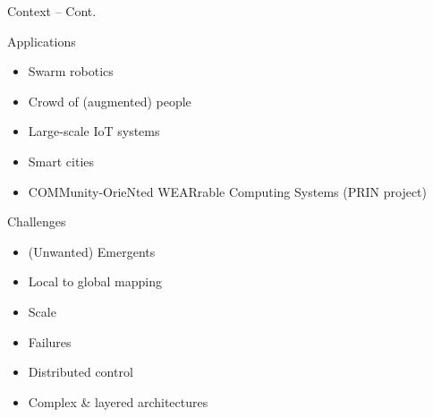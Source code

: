 \documentclass[presentation, 9pt, aspectratio=169]{beamer}\mode<presentation>{\usetheme{AMSBolognaFC}}
\begin{document}
\begin{frame}{Context -- Cont.}
\begin{alertblock}{Applications}
  \begin{multicols}{3}
    \begin{itemize}
      \item Swarm robotics
      \item Crowd of (augmented) people
      \item Large-scale IoT systems
      \item Smart cities
      \item COMMunity-OrieNted WEARrable Computing Systems (PRIN project)
    \end{itemize}
  \end{multicols}
\end{alertblock}

\begin{exampleblock}{Challenges}
  \begin{multicols}{3}
    \begin{itemize}
      \item (Unwanted) Emergents
      \item Local to global mapping
      \item Scale
      \item Failures
      \item Distributed control
      \item Complex \& layered architectures
    \end{itemize}
  \end{multicols}
\end{exampleblock}
\centering
\vspace{0.5 cm}
\end{frame}
\end{document}
